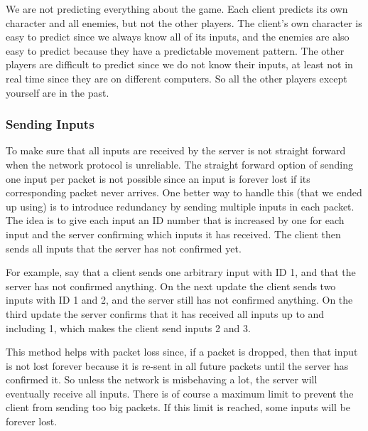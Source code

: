 \documentclass[a4paper]{article}
\begin{document}
We are not predicting everything about the game. Each client predicts its own character and all enemies, but not the other players. The client's own character is easy to predict since we always know all of its inputs, and the enemies are also easy to predict because they have a predictable movement pattern. The other players are difficult to predict since we do not know their inputs, at least not in real time since they are on different computers. So all the other players except yourself are in the past.

\subsubsection{Sending Inputs}\label{sec:sendinginputs}
To make sure that all inputs are received by the server is not straight forward when the network protocol is unreliable. The straight forward option of sending one input per packet is not possible since an input is forever lost if its corresponding packet never arrives. One better way to handle this (that we ended up using) is to introduce redundancy by sending multiple inputs in each packet. The idea is to give each input an ID number that is increased by one for each input and the server confirming which inputs it has received. The client then sends all inputs that the server has not confirmed yet.

For example, say that a client sends one arbitrary input with ID 1, and that the server has not confirmed anything. On the next update the client sends two inputs with ID 1 and 2, and the server still has not confirmed anything. On the third update the server confirms that it has received all inputs up to and including 1, which makes the client send inputs 2 and 3.

This method helps with packet loss since, if a packet is dropped, then that input is not lost forever because it is re-sent in all future packets until the server has confirmed it. So unless the network is misbehaving a lot, the server will eventually receive all inputs. There is of course a maximum limit to prevent the client from sending too big packets. If this limit is reached, some inputs will be forever lost.
\end{document}
